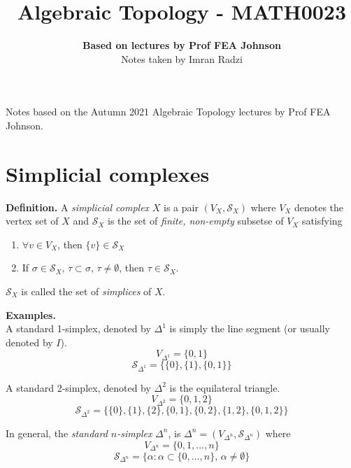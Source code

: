 \documentclass[a4paper,14pt]{extarticle}
\begin{document}
\title{\textbf{Algebraic Topology - MATH0023}}
\author{\textbf{Based on lectures by Prof FEA Johnson}\\ Notes taken by Imran Radzi}
\date{}
\maketitle

Notes based on the Autumn 2021 Algebraic Topology lectures by Prof FEA Johnson.
\begingroup
\let\cleardoublepage\clearpage
\tableofcontents
\endgroup
\newpage
{}

\vspace{12pt}

\section{Simplicial complexes}

\noindent\textbf{Definition.} A \textit{simplicial complex} $X$ is a pair $(V_X,\mathcal{S}_X)$ where $V_X$ denotes the vertex set of $X$ and $\mathcal{S}_X$ is the set of
\textit{finite, non-empty} subsetse of $V_X$ satisfying
\begin{enumerate}
	\item $\forall v\in V_X$, then $\{v\}\in\mathcal{S}_X$
	\item If $\sigma\in\mathcal{S}_X, \,\tau\subset\sigma, \,\tau\neq\emptyset$, then $\tau\in\mathcal{S}_X$. 
\end{enumerate}
$\mathcal{S}_X$ is called the set of \textit{simplices} of $X$. \\

\vspace{12pt}

\noindent\textbf{Examples.} \\

\noindent A standard 1-simplex, denoted by $\Delta^1$ is simply the line segment (or usually denoted by $I$). 
\[V_{\Delta^1}=\{0,1\}\] \[\mathcal{S}_{\Delta^1}=\{\{0\},\{1\},\{0,1\}\}\]

\vspace{12pt}

\noindent A standard 2-simplex, denoted by $\Delta^2$ is the equilateral triangle.
\[V_{\Delta^2}=\{0,1,2\}\] \[\mathcal{S}_{\Delta^2}=\{\{0\},\{1\},\{2\},\{0,1\},\{0,2\},\{1,2\},\{0,1,2\}\}\]

\vspace{12pt}

In general, the \textit{standard $n$-simplex} $\Delta^n$, is $\Delta^n=(V_{\Delta^n},\mathcal{S}_{\Delta^n})$ where
\[V_{\Delta^n}=\{0,1,\ldots,n\}\] \[\mathcal{S}_{\Delta^n}=\{\alpha:\alpha\subset\{0,\ldots,n\}, \,\alpha\neq\emptyset\}\]
\end{document}
